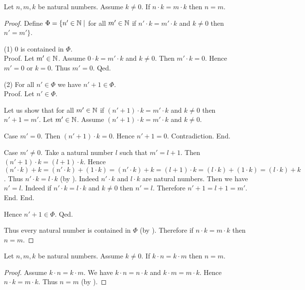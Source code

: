 \documentclass[10pt]{article}
\begin{document}
  \begin{forthel}
    \begin{proposition}
      Let $n, m, k$ be natural numbers.
      Assume $k \neq 0$.
      If $n \cdot k = m \cdot k$ then $n = m$.
    \end{proposition}
    \begin{proof}
      Define $\Phi = \{ n' \in \mathbb{N} \mid$ for all $m' \in \mathbb{N}$ if $n' \cdot k = m' \cdot k$ and $k \neq 0$ then $n' = m' \}$.

      (1) $0$ is contained in $\Phi$. \\
      Proof.
        Let $m' \in \mathbb{N}$.
        Assume $0 \cdot k = m' \cdot k$ and $k \neq 0$.
        Then $m' \cdot k = 0$.
        Hence $m' = 0$ or $k = 0$.
        Thus $m' = 0$.
      Qed.

      (2) For all $n' \in \Phi$ we have $n' + 1 \in \Phi$. \\
      Proof.
        Let $n' \in \Phi$.

        Let us show that for all $m' \in \mathbb{N}$ if $(n' + 1) \cdot k = m' \cdot k$ and $k \neq 0$ then $n' + 1 = m'$.
          Let $m' \in \mathbb{N}$.
          Assume $(n' + 1) \cdot k = m' \cdot k$ and $k \neq 0$.

          Case $m' = 0$.
            Then $(n' + 1) \cdot k = 0$.
            Hence $n' + 1 = 0$.
            Contradiction.
          End.

          Case $m' \neq 0$.
            Take a natural number $l$ such that $m' = l + 1$.
            Then $(n' + 1) \cdot k = (l + 1) \cdot k$.
            Hence $(n' \cdot k) + k
              = (n' \cdot k) + (1 \cdot k)
              = (n' \cdot k) + k
              = (l + 1) \cdot k
              = (l \cdot k) + (1 \cdot k)
              = (l \cdot k) + k$.
            Thus $n' \cdot k = l \cdot k$ (by ).
            Indeed $n' \cdot k$ and $l \cdot k$ are natural numbers.
            Then we have $n' = l$.
            Indeed if $n' \cdot k = l \cdot k$ and $k \neq 0$ then $n' = l$.
            Therefore $n' + 1 = l + 1 = m'$.
          End.
        End.

        Hence $n' + 1 \in \Phi$.
      Qed.

      Thus every natural number is contained in $\Phi$ (by ).
      Therefore if $n \cdot k = m \cdot k$ then $n = m$.
    \end{proof}
  \end{forthel}

  \begin{forthel}
    \begin{corollary}
      Let $n, m, k$ be natural numbers.
      Assume $k \neq 0$.
      If $k \cdot n = k \cdot m$ then $n = m$.
    \end{corollary}
    \begin{proof}
      Assume $k \cdot n = k \cdot m$.
      We have $k \cdot n = n \cdot k$ and $k \cdot m = m \cdot k$.
      Hence $n \cdot k = m \cdot k$.
      Thus $n = m$ (by ).
    \end{proof}
  \end{forthel}
\end{document}

